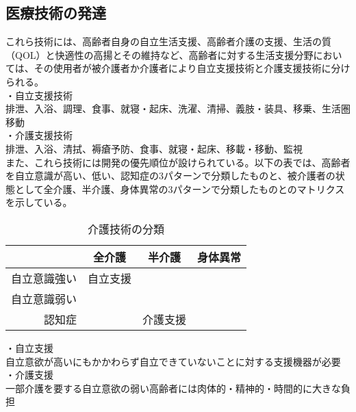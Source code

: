 
\subsection{医療技術の発達}


これら技術には、高齢者自身の自立生活支援、高齢者介護の支援、生活の質（QOL）と快適性の高揚とその維持など、高齢者に対する生活支援分野においては、その使用者が被介護者か介護者により自立支援技術と介護支援技術に分けられる。\\
・自立支援技術 \\
排泄、入浴、調理、食事、就寝・起床、洗濯、清掃、義肢・装具、移乗、生活圏移動 \\
・介護支援技術 \\
排泄、入浴、清拭、褥瘡予防、食事、就寝・起床、移載・移動、監視 \\
また、これら技術には開発の優先順位が設けられている。以下の表では、高齢者を自立意識が高い、低い、認知症の3パターンで分類したものと、被介護者の状態として全介護、半介護、身体異常の3パターンで分類したものとのマトリクスを示している。

\begin{table}[htb]
  \caption[介護技術の分類]{介護技術の分類}
  \label{model_explaination}
  \centering
  \begin{tabular}{r|c|c|c}
     & 全介護 & 半介護 & 身体異常 \\ \hline
    自立意識強い & 自立支援 & \quad & \quad \\
    自立意識弱い & \quad & \quad &  \quad \\
    認知症 & \quad & 介護支援 & \quad \\
    \end{tabular}
\end{table}

・自立支援 \\
自立意欲が高いにもかかわらず自立できていないことに対する支援機器が必要 \\
・介護支援 \\
一部介護を要する自立意欲の弱い高齢者には肉体的・精神的・時間的に大きな負担 \\



